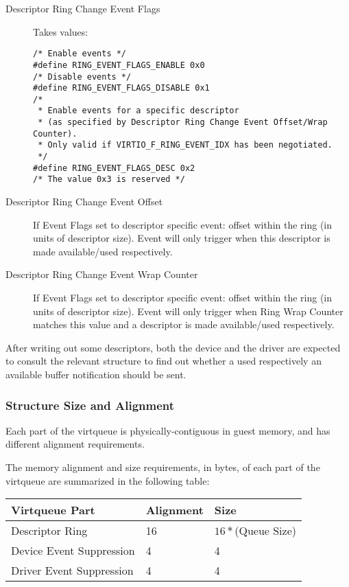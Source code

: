 \begin{description}
\item [Descriptor Ring Change Event Flags] Takes values:
\begin{lstlisting}
/* Enable events */
#define RING_EVENT_FLAGS_ENABLE 0x0
/* Disable events */
#define RING_EVENT_FLAGS_DISABLE 0x1
/*
 * Enable events for a specific descriptor
 * (as specified by Descriptor Ring Change Event Offset/Wrap Counter).
 * Only valid if VIRTIO_F_RING_EVENT_IDX has been negotiated.
 */
#define RING_EVENT_FLAGS_DESC 0x2
/* The value 0x3 is reserved */
\end{lstlisting}
\item [Descriptor Ring Change Event Offset] If Event Flags set to descriptor
specific event: offset within the ring (in units of descriptor
size). Event will only trigger when this descriptor is
made available/used respectively.
\item [Descriptor Ring Change Event Wrap Counter] If Event Flags set to descriptor
specific event: offset within the ring (in units of descriptor
size). Event will only trigger when Ring Wrap Counter
matches this value and a descriptor is
made available/used respectively.
\end{description}

After writing out some descriptors, both the device and the driver
are expected to consult the relevant structure to find out
whether a used respectively an available buffer notification should be sent.

\subsubsection{Structure Size and Alignment}
\label{sec:Packed Virtqueues / Structure Size and Alignment}

Each part of the virtqueue is physically-contiguous in guest memory,
and has different alignment requirements.

The memory alignment and size requirements, in bytes, of each part of the
virtqueue are summarized in the following table:

\begin{tabular}{|l|l|l|}
\hline
Virtqueue Part    & Alignment & Size \\
\hline \hline
Descriptor Ring  & 16        & $16 * $(Queue Size) \\
\hline
Device Event Suppression    & 4         & 4 \\
 \hline
Driver Event Suppression         & 4         & 4 \\
 \hline
\end{tabular}

